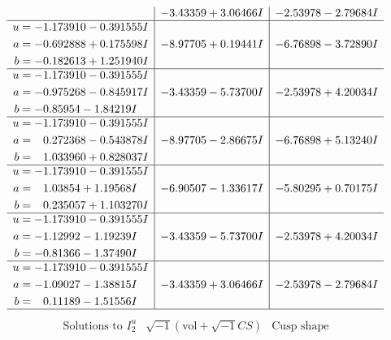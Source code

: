 \documentclass[1p]{elsarticle_modified}
\theoremstyle{definition}
\newcommand{\I}{\sqrt{-1}}
\begin{document}
$$\begin{array}{c|c|c}
 & -3.43359 + 3.06466 I & -2.53978 - 2.79684 I \\ \hline\begin{aligned}
u &= -1.173910 - 0.391555 I \\
a &= -0.692888 + 0.175598 I \\
b &= -0.182613 + 1.251940 I\end{aligned}
 & -8.97705 + 0.19441 I & -6.76898 - 3.72890 I \\ \hline\begin{aligned}
u &= -1.173910 - 0.391555 I \\
a &= -0.975268 - 0.845917 I \\
b &= -0.85954 - 1.84219 I\end{aligned}
 & -3.43359 - 5.73700 I & -2.53978 + 4.20034 I \\ \hline\begin{aligned}
u &= -1.173910 - 0.391555 I \\
a &= \phantom{-}0.272368 - 0.543878 I \\
b &= \phantom{-}1.033960 + 0.828037 I\end{aligned}
 & -8.97705 - 2.86675 I & -6.76898 + 5.13240 I \\ \hline\begin{aligned}
u &= -1.173910 - 0.391555 I \\
a &= \phantom{-}1.03854 + 1.19568 I \\
b &= \phantom{-}0.235057 + 1.103270 I\end{aligned}
 & -6.90507 - 1.33617 I & -5.80295 + 0.70175 I \\ \hline\begin{aligned}
u &= -1.173910 - 0.391555 I \\
a &= -1.12992 - 1.19239 I \\
b &= -0.81366 - 1.37490 I\end{aligned}
 & -3.43359 - 5.73700 I & -2.53978 + 4.20034 I \\ \hline\begin{aligned}
u &= -1.173910 - 0.391555 I \\
a &= -1.09027 - 1.38815 I \\
b &= \phantom{-}0.11189 - 1.51556 I\end{aligned}
 & -3.43359 + 3.06466 I & -2.53978 - 2.79684 I\\
 \hline 
 \end{array}$$\newpage$$\begin{array}{c|c|c}  
\text{Solutions to }I^u_{2}& \I (\text{vol} + \sqrt{-1}CS) & \text{Cusp shape}\\

\end{array}$$
\end{document}
